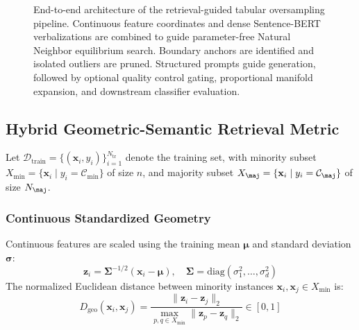 \documentclass[sn-basic]{sn-jnl}
\begin{document}
\begin{figure}[t]
{
}
\caption{End-to-end architecture of the retrieval-guided tabular oversampling pipeline. Continuous feature coordinates and dense Sentence-BERT verbalizations are combined to guide parameter-free Natural Neighbor equilibrium search. Boundary anchors are identified and isolated outliers are pruned. Structured prompts guide generation, followed by optional quality control gating, proportional manifold expansion, and downstream classifier evaluation.}
\label{fig:workflow_diagram}
\end{figure}

\subsection{Hybrid Geometric-Semantic Retrieval Metric}
\label{subsec:hybrid_metric}
Let $\mathcal{D}_{\text{train}} = \{(\mathbf{x}_i, y_i)\}_{i=1}^{N_{\text{tr}}}$ denote the training set, with minority subset $X_{\min} = \{\mathbf{x}_i \mid y_i = \mathcal{C}_{\min}\}$ of size $n$, and majority subset $X_{\maj} = \{\mathbf{x}_i \mid y_i = \mathcal{C}_{\maj}\}$ of size $N_{\maj}$.

\subsubsection{Continuous Standardized Geometry}
Continuous features are scaled using the training mean $\boldsymbol{\mu}$ and standard deviation $\boldsymbol{\sigma}$:
\begin{equation}
\label{eq:standardization}
\mathbf{z}_i = \mathbf{\Sigma}^{-1/2} (\mathbf{x}_i - \boldsymbol{\mu}), \quad \mathbf{\Sigma} = \text{diag}(\sigma_1^2, \dots, \sigma_d^2)
\end{equation}
The normalized Euclidean distance between minority instances $\mathbf{x}_i, \mathbf{x}_j \in X_{\min}$ is:
\begin{equation}
\label{eq:geo_distance}
D_{\text{geo}}(\mathbf{x}_i, \mathbf{x}_j) = \frac{\|\mathbf{z}_i - \mathbf{z}_j\|_2}{\max_{p, q \in X_{\min}} \|\mathbf{z}_p - \mathbf{z}_q\|_2} \in [0, 1]
\end{equation}
\end{document}
